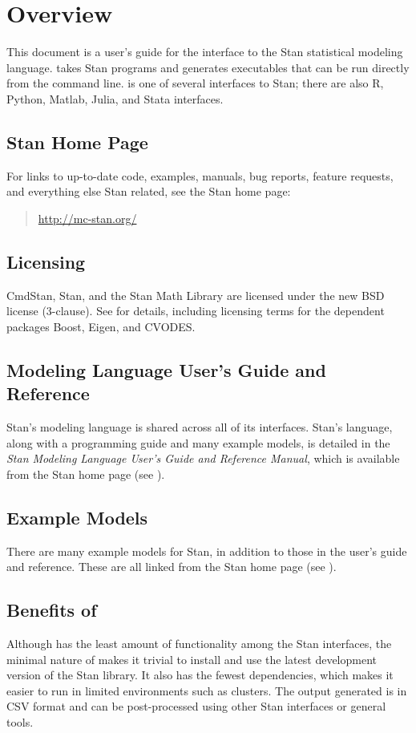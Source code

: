 \chapter{Overview}

\noindent
This document is a user's guide for the \CmdStan interface to the
Stan statistical modeling language. \CmdStan takes Stan programs
and generates executables that can be run directly from the command
line. \CmdStan is one of several interfaces to Stan; there are also R,
Python, Matlab, Julia, and Stata interfaces.

\section{Stan Home Page}\label{home-page.section}

For links to up-to-date code, examples, manuals, bug reports, feature
requests, and everything else Stan related, see the Stan home page:
%
\begin{quote}
\url{http://mc-stan.org/}
\end{quote}


\section{Licensing}

CmdStan, Stan, and the Stan Math Library are licensed under the new
BSD license (3-clause).  See  for details,
including licensing terms for the dependent packages Boost, Eigen, and
CVODES.


\section{Modeling Language User's Guide and Reference}

Stan's modeling language is shared across all of its interfaces.
Stan's language, along with a programming guide and many example
models, is detailed in the {\it Stan Modeling Language User's Guide
  and Reference Manual}, which is available from the Stan home page
(see ).

\section{Example Models}

There are many example models for Stan, in addition to those in the
user's guide and reference. These are all linked from the Stan home
page (see ).


\section{Benefits of \CmdStan}

Although \CmdStan has the least amount of functionality among the
Stan interfaces, the minimal nature of \CmdStan makes it trivial to
install and use the latest development version of the Stan
library. It also has the fewest dependencies, which makes it easier to
run in limited environments such as clusters. The output generated is
in CSV format and can be post-processed using other Stan interfaces or
general tools.

